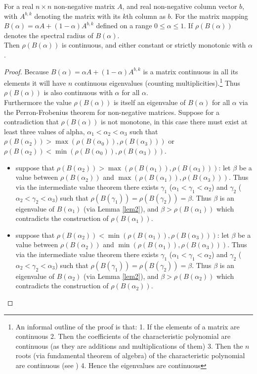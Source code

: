 \begin{Theorem}\label{th:2}
For a real $n\times n$ non-negative matrix $A$, and real non-negative column vector $b$, with $A^{b,k}$ denoting the matrix with its $k$th column as $b$.
For the matrix mapping $B(\alpha) = \alpha A + (1-\alpha)A^{b,k}$ defined on a range $0\le\alpha\le1$. If $\rho(B(\alpha))$ denotes the spectral radius of $B(\alpha)$.\\ Then $\rho(B(\alpha))$ is continuous, and either constant or strictly monotonic with $\alpha$.
\end{Theorem}
\begin{proof}
Because $B(\alpha) = \alpha A + (1-\alpha)A^{b,k}$ is a matrix continuous in all its elements it will have $n$ continuous eigenvalues (counting multiplicities).\footnote{An informal outline of the proof is that: 1. If the elements of a matrix are continuous 2. Then the coefficients of the characteristic polynomial are continuous (as they are additions and multiplications of them) 3. Then the $n$ roots (via fundamental theorem of algebra) of the characteristic polynomial are continuous (see \cite{10.2307/2045978}) 4. Hence the eigenvalues are continuous}
Thus $\rho(B(\alpha))$ is also continuous with $\alpha$ for all $\alpha$.\\
Furthermore the value $\rho(B(\alpha))$ is itself an eigenvalue of $B(\alpha)$ for all $\alpha$ via the Perron-Frobenius theorem for non-negative matrices.
Suppose for a contradiction that $\rho(B(\alpha))$ is not monotone, in this case there must exist at least three values of alpha, $\alpha_1<\alpha_2<\alpha_3$ such that $\rho(B(\alpha_2))>\max(\rho(B(\alpha_0)),\rho(B(\alpha_3)))$ or $\rho(B(\alpha_2))<\min(\rho(B(\alpha_0)),\rho(B(\alpha_3)))$.
\begin{itemize}[leftmargin=*,labelsep=4mm]
\item	suppose that $\rho(B(\alpha_2))>\max(\rho(B(\alpha_1)),\rho(B(\alpha_3)))$: let $\beta$ be a value between $\rho(B(\alpha_2))$ and $\max(\rho(B(\alpha_1)),\rho(B(\alpha_3)))$. Thus via the intermediate value theorem there exists $\gamma_1$ ($\alpha_1<\gamma_1<\alpha_2$) and $\gamma_2$ ($\alpha_2<\gamma_2<\alpha_3$) such that $\rho(B(\gamma_1))=\rho(B(\gamma_2))=\beta$. Thus $\beta$ is an eigenvalue of $B(\alpha_1)$ (via Lemma \ref{lem2}), and $\beta > \rho(B(\alpha_1))$ which contradicts the construction of $\rho(B(\alpha_1))$.
\item   suppose that $\rho(B(\alpha_2))<\min(\rho(B(\alpha_1)),\rho(B(\alpha_3)))$: let $\beta$ be a value between $\rho(B(\alpha_2))$ and $\min(\rho(B(\alpha_1)),\rho(B(\alpha_3)))$. Thus via the intermediate value theorem there exists $\gamma_1$ ($\alpha_1<\gamma_1<\alpha_2$) and $\gamma_2$ ($\alpha_2<\gamma_2<\alpha_3$) such that $\rho(B(\gamma_1))=\rho(B(\gamma_2))=\beta$. Thus $\beta$ is an eigenvalue of $B(\alpha_2)$ (via Lemma \ref{lem2}), and $\beta > \rho(B(\alpha_2))$ which contradicts the construction of $\rho(B(\alpha_2))$.

\end{itemize}
\end{proof}

